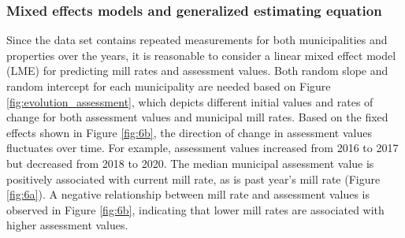 \documentclass{article}
\begin{document}
\subsubsection{Mixed effects models and generalized estimating equation}
Since the data set contains repeated measurements for both municipalities and properties over the years, it is reasonable to consider a linear mixed effect model (LME) for predicting mill rates and assessment values. Both random slope and random intercept for each municipality are needed based on Figure \ref{fig:evolution_assessment}, which depicts different initial values and rates of change for both assessment values and municipal mill rates.  Based on the fixed effects shown in Figure \ref{fig:6b}, the direction of change in assessment values fluctuates over time. For example, assessment values increased from 2016 to 2017 but decreased from 2018 to 2020. The median municipal assessment value is positively associated with current mill rate, as is past year's mill rate (Figure \ref{fig:6a}). A negative relationship between mill rate and assessment values is observed in Figure \ref{fig:6b}, indicating that lower mill rates are associated with higher assessment values. 
\end{document}
